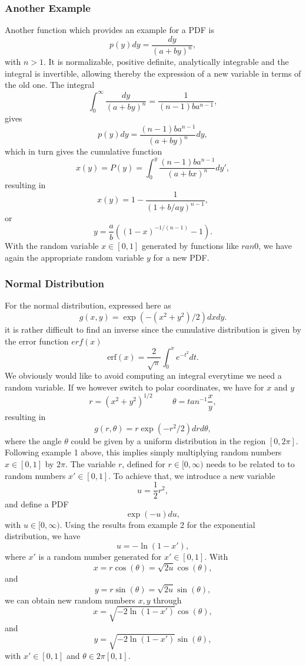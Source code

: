\subsubsection{Another Example}
Another function which provides an example for a PDF is
\[
   p(y)dy=\frac{dy}{(a+by)^n},
\]
with $n > 1$. It is normalizable, positive definite, analytically
integrable and the integral is invertible, allowing thereby
the expression of a new variable in terms of the old one. 
The integral
\[ 
   \int_0^{\infty} \frac{dy}{(a+by)^n}=\frac{1}{(n-1)ba^{n-1}},
\]
gives
\[
   p(y)dy=\frac{(n-1)ba^{n-1}}{(a+by)^n}dy,
\]
which in turn gives the cumulative function
\[
   x(y)=P(y)=\int_0^y \frac{(n-1)ba^{n-1}}{(a+bx)^n}dy',
\]
resulting in
\[
x(y)=1-\frac{1}{(1+b/ay)^{n-1}},
\]
or 
\[
   y=\frac{a}{b}\left((1-x)^{-1/(n-1)}-1\right).
\]
With the random variable $x \in [0,1]$ generated by
functions like $ran0$, we have again the appropriate random
variable $y$ for a new PDF. 

 



\subsubsection{Normal Distribution}

For the normal distribution, expressed here as
\[
  g(x,y)=\exp{(-(x^2+y^2)/2)}dxdy.
\]
it is rather difficult to find an inverse since the cumulative
distribution is given by the error function $erf(x)$  %
\[
    \mathrm{erf}(x) = \frac{2}{\sqrt{\pi}}\int_{0}^x e^{-t^2} dt. 
\]
We obviously would like to avoid computing an integral everytime we need a random variable.
If we however switch to polar coordinates, we have
for $x$ and $y$
\[
   r=\left(x^2+y^2\right)^{1/2} \hspace{1cm}
   \theta =tan^{-1}\frac{x}{y},
\]
resulting in 
\[
  g(r,\theta)=r\exp{(-r^2/2)}drd\theta,
\]
where the angle $\theta$ could be given by a uniform 
distribution in the region $[0,2\pi]$.
Following example 1 above, this implies simply 
multiplying random numbers 
$x\in [0,1]$ by $2\pi$. 
The variable 
$r$, defined for $r \in [0,\infty)$ needs to be related to
to random numbers $x'\in [0,1]$. To achieve that, we introduce a new variable
\[
   u=\frac{1}{2}r^2,
\]
and define a PDF
\[
  \exp{(-u)}du,
\]
with $u\in [0,\infty)$. 
Using the results from example 2 for the exponential distribution, we have
\[
   u=-\ln{(1-x')},
\]
where $x'$ is a random number generated for $x'\in [0,1]$. 
With 
\[
  x=r\cos{(\theta)}=\sqrt{2u}\cos{(\theta)},
\]
and
\[
  y=r\sin{(\theta)}=\sqrt{2u}\sin{(\theta)},
\]
we can obtain new random numbers $x,y$ through
\[
  x=\sqrt{-2\ln{(1-x')}}\cos{(\theta)},
\]
and
\[
  y=\sqrt{-2\ln{(1-x')}}\sin{(\theta)},
\]
with $x'\in [0,1]$ and $\theta \in 2\pi [0,1]$. 

